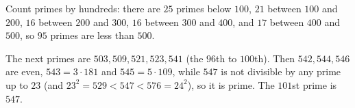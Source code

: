 Count primes by hundreds: there are $25$ primes below $100$, $21$ between $100$ and $200$, $16$ between $200$ and $300$, $16$ between $300$ and $400$, and $17$ between $400$ and $500$, so $95$ primes are less than $500$.

The next primes are $503,509,521,523,541$ (the $96$th to $100$th). Then $542,544,546$ are even, $543=3\cdot181$ and $545=5\cdot109$, while $547$ is not divisible by any prime up to $23$ (and $23^2=529<547<576=24^2$), so it is prime. The $101$st prime is $\boxed{547}$.
